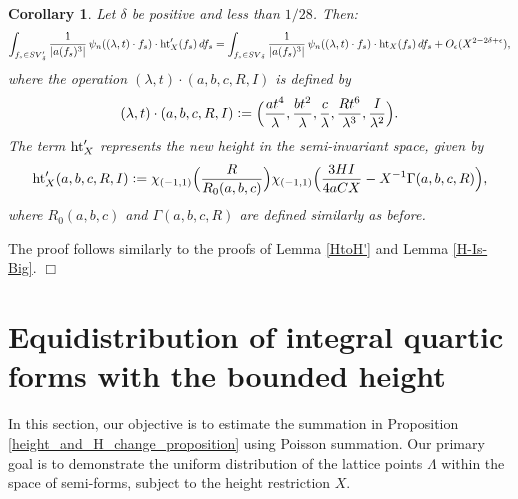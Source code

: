 \documentclass{article}
\def \h{{\rm ht}}
\newtheorem{cor}[theorem]{Corollary}
\newenvironment{proof}{\noindent {\bf Proof:}}{$\Box$ \vspace{2 ex}}
\def \SV{{SV}_{\delta}}
\begin{document}
\begin{cor}\label{SV'toSV}
Let $\delta$ be positive and less than $1/28$. Then:
\begin{equation*}
    \int_{f_s \in \SV'} \frac{1}{|a(f_s)^3|}\,  \psi_{n}((\lambda,t)\cdot f_s) \cdot \h_X'(f_s) \, df_s = \int_{f_s \in \SV}  \frac{1}{|a(f_s)^3|}\, \psi_{n}((\lambda,t)\cdot f_s) \cdot \h_X(f_s) \, df_s + O_{\epsilon}(X^{2-2\delta+\epsilon}),
\end{equation*}
where the operation $(\lambda,t) \cdot (a,b,c,R,I)$ is defined by
\begin{equation*}
    (\lambda,t) \cdot (a,b,c,R,I) \vcentcolon= \Big( \frac{at^4}{\lambda}, \frac{bt^2}{\lambda}, \frac{c}{\lambda}, \frac{Rt^6}{\lambda^3}, \frac{I}{\lambda^2} \Big).
\end{equation*}
The term $\h_X'$ represents the new height in the semi-invariant space, given by
\begin{equation*} 
       \h_X'(a,b,c,R,I) \vcentcolon= \chi_{(-1,1)}\Big(\frac{R}{R_0(a,b,c)}\Big) \chi_{(-1,1)}\Big(\frac{3HI}{4aCX}-X^{-1}\Gamma(a,b,c,R)\Big),
\end{equation*}
where $R_0(a,b,c)$ and $\Gamma(a,b,c,R)$ are defined similarly as before.  
\end{cor}
\begin{proof}
The proof follows similarly to the proofs of Lemma \ref{HtoH'} and Lemma \ref{H-Is-Big}.
\end{proof}





 \section{Equidistribution of integral quartic forms with the bounded height}\label{sec3}

In this section, our objective is to estimate the summation in Proposition \ref{height_and_H_change_proposition} using Poisson summation. Our primary goal is to demonstrate the uniform distribution of the lattice points $\Lambda$ within the space of semi-forms, subject to the height restriction $X$.
\end{document}
